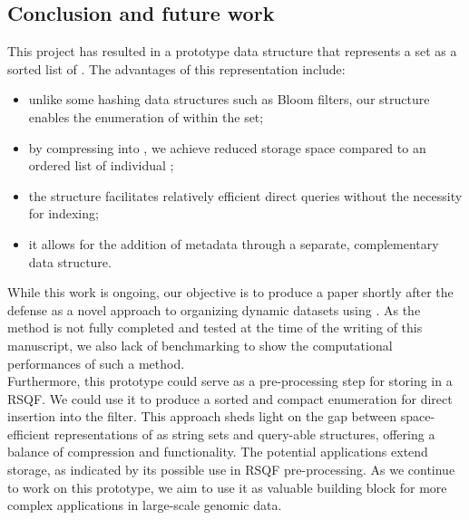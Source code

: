 \subsection{Conclusion and future work}
This project has resulted in a prototype data structure that represents a \kmer set as a sorted list of \skmers. The advantages of this representation include:
\begin{itemize}
	\item unlike some hashing data structures such as Bloom filters, our structure enables the enumeration of \kmers within the set;
	\item by compressing \kmers into \skmers, we achieve reduced storage space compared to an ordered list of individual \kmers;
	\item the structure facilitates relatively efficient direct queries without the necessity for indexing;
	\item it allows for the addition of metadata through a separate, complementary data structure.
\end{itemize}
While this work is ongoing, our objective is to produce a paper shortly after the defense as a novel approach to organizing dynamic datasets using \kmers. As the method is not fully completed and tested at the time of the writing of this manuscript, we also lack of benchmarking to show the computational performances of such a method.\\
Furthermore, this prototype could serve as a pre-processing step for storing \kmers in a RSQF. We could use it to produce a sorted and compact \kmer enumeration for direct insertion into the filter.
This approach sheds light on the gap between space-efficient representations of \kmers as string sets and query-able structures, offering a balance of compression and functionality. The potential applications extend storage, as indicated by its possible use in RSQF pre-processing. As we continue to work on this prototype, we aim to use it as valuable building block for more complex applications in large-scale genomic data.


